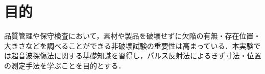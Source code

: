 \section{目的}
品質管理や保守検査において，素材や製品を破壊せずに欠陥の有無・存在位置・大きさなどを調べることができる非破壊試験の重要性は高まっている．本実験では超音波探傷法に関する基礎知識を習得し，パルス反射法によるきず寸法・位置の測定手法を学ぶことを目的とする．